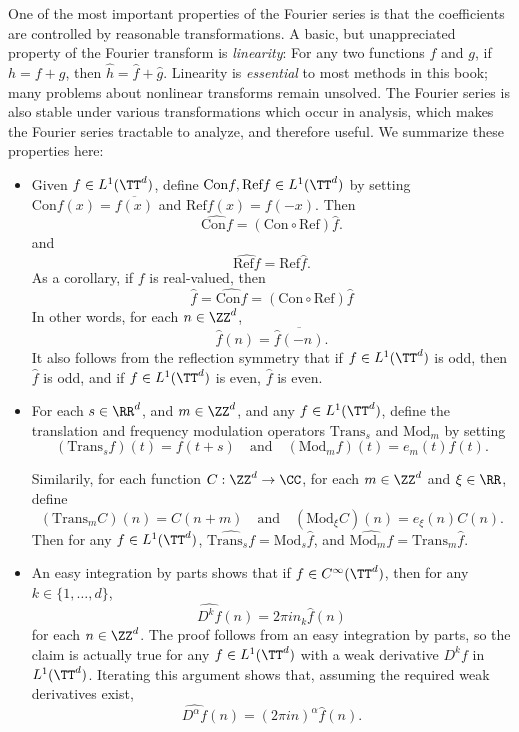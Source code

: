 One of the most important properties of the Fourier series is that the coefficients are controlled by reasonable transformations. A basic, but unappreciated property of the Fourier transform is \emph{linearity}: For any two functions $f$ and $g$, if $h = f + g$, then $\widehat{h} = \widehat{f} + \widehat{g}$. Linearity is \emph{essential} to most methods in this book; many problems about nonlinear transforms remain unsolved. The Fourier series is also stable under various transformations which occur in analysis, which makes the Fourier series tractable to analyze, and therefore useful. We summarize these properties here:
%
\begin{itemize}
    \item Given $f \in L^1(\TT^d)$, define $\text{Con} f, \text{Ref} f \in L^1(\TT^d)$ by setting $\text{Con} f(x) = \overline{f(x)}$ and $\text{Ref} f(x) = f(-x)$. Then
    \[ \widehat{\text{Con} f} = (\text{Con} \circ \text{Ref}) \widehat{f}. \]
    and
    \[ \widehat{\text{Ref} f} = \text{Ref} \widehat{f}. \]
    As a corollary, if $f$ is real-valued, then
    \[ \widehat{f} = \widehat{\text{Con} f} = (\text{Con} \circ \text{Ref}) \widehat{f} \]
    In other words, for each $n \in \ZZ^d$,
    \[ \widehat{f}(n) = \overline{\widehat{f}(-n)}. \]
    It also follows from the reflection symmetry that if $f \in L^1(\TT^d)$ is odd, then $\widehat{f}$ is odd, and if $f \in L^1(\TT^d)$ is even, $\widehat{f}$ is even.

    \item For each $s \in \RR^d$, and $m \in \ZZ^d$, and any $f \in L^1(\TT^d)$, define the translation and frequency modulation operators $\text{Trans}_s$ and $\text{Mod}_m$ by setting
    \[ (\text{Trans}_s f)(t) = f(t + s) \quad\text{and}\quad (\text{Mod}_m f)(t) = e_m(t) f(t). \]

    Similarily, for each function $C: \ZZ^d \to \CC$, for each $m \in \ZZ^d$ and $\xi \in \RR$, define
    \[ (\text{Trans}_m C)(n) = C(n + m) \quad\text{and}\quad (\text{Mod}_\xi C)(n) = e_\xi(n) C(n). \]
    Then for any $f \in L^1(\TT^d)$, $\widehat{\text{Trans}_s f} = \text{Mod}_s \widehat{f}$, and $\widehat{\text{Mod}_m f} = \text{Trans}_m \widehat{f}$.

    \item An easy integration by parts shows that if $f \in C^\infty(\TT^d)$, then for any $k \in \{ 1, \dots, d \}$,
    \[ \widehat{D^k f}(n) = 2 \pi i n_k \widehat{f}(n) \]
    for each $n \in \ZZ^d$. The proof follows from an easy integration by parts, so the claim is actually true for any $f \in L^1(\TT^d)$ with a weak derivative $D^k f$ in $L^1(\TT^d)$. Iterating this argument shows that, assuming the required weak derivatives exist,
    \[ \widehat{D^\alpha f}(n) = (2 \pi i n)^\alpha \widehat{f}(n). \]
\end{itemize}


